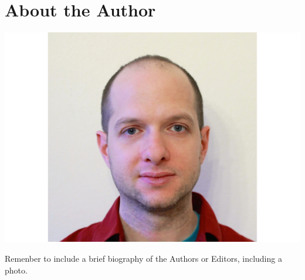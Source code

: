 \chapter*{About the Author}


\includegraphics{Mesinger/Author}

Remenber to include a brief biography of the Authors or Editors, including a photo.
